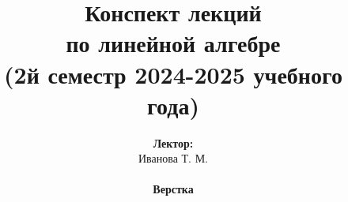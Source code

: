 \documentclass[../main.tex]{subfiles}
\begin{document}
\title{
    \bfseries
    {\Huge Конспект лекций\\ по линейной алгебре}\\
    {\large (2й семестр 2024-2025 учебного года)}
}
\author{
    \textbf{Лектор:}\\ Иванова Т. М.
    \\ ~ \\ 
    \textbf{Верстка}\\%
}

\date{}
\maketitle
\setcounter{page}{2}
\end{document}
